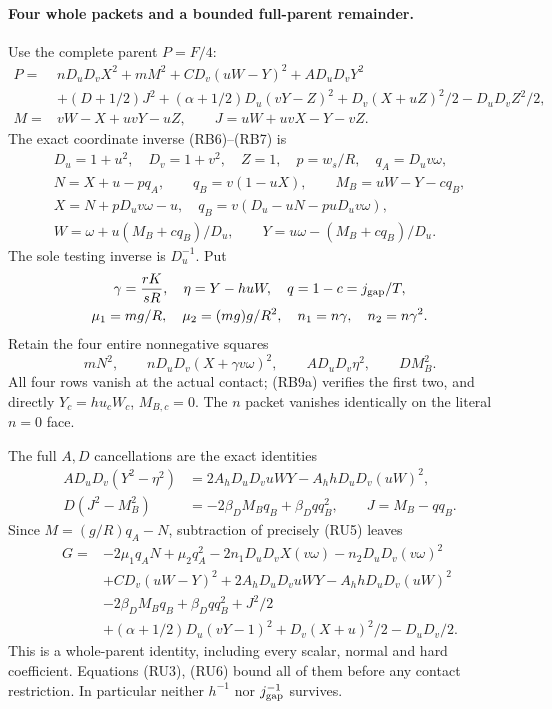 \paragraph{Four whole packets and a bounded full-parent remainder.}
Use the complete parent $P=F/4$:
\[
\begin{aligned}
 P={}&nD_uD_vX^2+mM^2+CD_v(uW-Y)^2+AD_uD_vY^2\\
 &+(D+1/2)J^2+(\alpha+1/2)D_u(vY-Z)^2
                   +D_v(X+uZ)^2/2-D_uD_vZ^2/2,\\
 M={}&vW-X+uvY-uZ,\qquad J=uW+uvX-Y-vZ.
\end{aligned}
\]
The exact coordinate inverse (RB6)--(RB7) is
\[
\begin{gathered}
 D_u=1+u^2,\quad D_v=1+v^2,\quad Z=1,\quad
 p=w_s/R,\quad q_A=D_uv\omega,\\
 N=X+u-pq_A,\qquad q_B=v(1-uX),\qquad M_B=uW-Y-cq_B,\\
 X=N+pD_uv\omega-u,\quad q_B=v(D_u-uN-puD_uv\omega),\\
 W=\omega+u(M_B+cq_B)/D_u,\qquad
 Y=u\omega-(M_B+cq_B)/D_u.
\end{gathered}                                                     \tag{RU4}
\]
The sole testing inverse is $D_u^{-1}$. Put
\[
 \begin{gathered}
 \gamma=\frac{rK}{sR},\quad \eta=Y-huW,\quad q=1-c=j_{\rm gap}/T,\\
 \mu_1=mg/R,\quad \mu_2=(mg)g/R^2,\quad n_1=n\gamma,\quad n_2=n\gamma^2.
 \end{gathered}
\]
Retain the four entire nonnegative squares
\[
 mN^2,\qquad nD_uD_v(X+\gamma v\omega)^2,
 \qquad AD_uD_v\eta^2,\qquad DM_B^2.
 \tag{RU5}
\]
All four rows vanish at the actual contact; (RB9a) verifies the first
two, and directly $Y_c=hu_cW_c$, $M_{B,c}=0$.
The $n$ packet vanishes identically on the literal $n=0$ face.

The full $A,D$ cancellations are the exact identities
\[
\begin{aligned}
 AD_uD_v(Y^2-\eta^2)&=2A_hD_uD_vuWY-A_hhD_uD_v(uW)^2,\\
 D(J^2-M_B^2)&=-2\beta_DM_Bq_B+\beta_Dq q_B^2,
 \qquad J=M_B-q q_B.
\end{aligned}                                                     \tag{RU6}
\]
Since $M=(g/R)q_A-N$, subtraction of precisely (RU5) leaves
\[
\begin{aligned}
 G={}&-2\mu_1q_AN+\mu_2q_A^2
       -2n_1D_uD_vX(v\omega)-n_2D_uD_v(v\omega)^2\\
    &+CD_v(uW-Y)^2+2A_hD_uD_vuWY-A_hhD_uD_v(uW)^2\\
    &-2\beta_DM_Bq_B+\beta_Dq q_B^2+J^2/2\\
    &+(\alpha+1/2)D_u(vY-1)^2+D_v(X+u)^2/2-D_uD_v/2.
\end{aligned}                                                     \tag{RU7}
\]
This is a whole-parent identity, including every scalar, normal and
hard coefficient. Equations (RU3), (RU6) bound all of them before
any contact restriction. In particular neither $h^{-1}$ nor
$j_{\rm gap}^{-1}$ survives.

